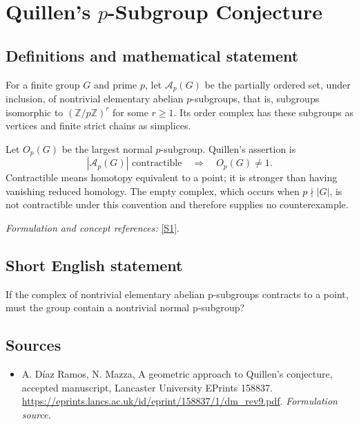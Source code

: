 \documentclass[11pt]{article}
\begin{document}
\section*{\texorpdfstring{Quillen's $p$-Subgroup Conjecture}{Quillen's \$p\$-Subgroup Conjecture}}\label{statement}
\subsection{Definitions and mathematical statement}
For a finite group $G$ and prime $p$, let $\mathcal A_p(G)$ be the partially ordered set, under inclusion, of nontrivial elementary abelian $p$-subgroups, that is, subgroups isomorphic to $({\mathbb{Z}}/p{\mathbb{Z}})^r$ for some $r\ge1$. Its order complex has these subgroups as vertices and finite strict chains as simplices.

Let $O_p(G)$ be the largest normal $p$-subgroup. Quillen's assertion is
\[
 |\mathcal A_p(G)|\text{ contractible}
                   \quad\Longrightarrow\quad O_p(G)\ne1.
\]
Contractible means homotopy equivalent to a point; it is stronger than having vanishing reduced homology. The empty complex, which occurs when $p\nmid|G|$, is not contractible under this convention and therefore supplies no counterexample.
\par\smallskip\textit{Formulation and concept references:} \href{https://eprints.lancs.ac.uk/id/eprint/158837/1/dm_rev9.pdf}{[S1]}.

\subsection{Short English statement}
If the complex of nontrivial elementary abelian p-subgroups contracts to a point, must the group contain a nontrivial normal p-subgroup?
\subsection{Sources}
\begin{itemize}
\item[S1]A. Díaz Ramos, N. Mazza, A geometric approach to Quillen's conjecture, accepted manuscript, Lancaster University EPrints 158837.
\url{https://eprints.lancs.ac.uk/id/eprint/158837/1/dm_rev9.pdf}.
\textit{Formulation source.}
\end{itemize}
\end{document}

